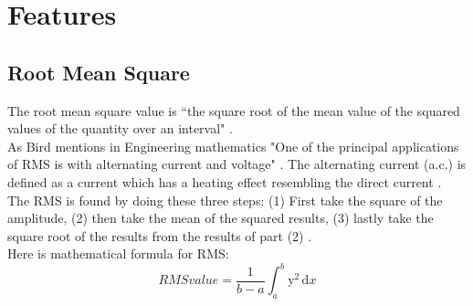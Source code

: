 \section{Features}
\subsection{Root Mean Square}
The root mean square value is “the square root of the mean value of the squared values of the quantity over an interval"  \citep{Bird2007}.
\\
As Bird mentions in Engineering mathematics "One of the principal applications of RMS is with alternating current and voltage" \citep{Bird2007}. The alternating current (a.c.) is defined as a current which has a heating effect resembling the direct current \citep{Bird2007}.
\\
The RMS is found by doing these three steps:
(1) First take the square of the amplitude, (2) then take the mean of the squared results, (3) lastly take the square root of the results from the results of part (2) \citep{Bird2007}. \\ Here is \citep{Bird2007} mathematical formula for RMS:
\begin{equation}\label{eq:RMS formular}
RMS value = \frac{1}{b-a}\int_a^b\mathrm{y}^{2}\,\mathrm{d}x
\end{equation}
